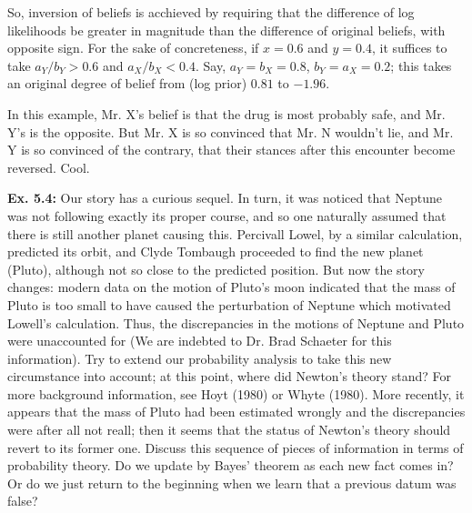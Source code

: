 \documentclass{article}
\begin{document}
So, inversion of beliefs is acchieved by requiring that the difference of log likelihoods be greater in magnitude than the difference of original beliefs, with opposite sign. For the sake of concreteness, if $x=0.6$ and $y=0.4$, it suffices to take $a_Y/b_Y>0.6$ and $a_X/b_X<0.4$. Say, $a_Y=b_X=0.8$, $b_Y=a_X=0.2$; this takes an original degree of belief from (log prior) $0.81$ to $-1.96$.

In this example, Mr. X's belief is that the drug is most probably safe, and Mr. Y's is the opposite. But Mr. X is so convinced that Mr. N wouldn't lie, and Mr. Y is so convinced of the contrary, that their stances after this encounter become reversed. Cool.

\textbf{Ex. 5.4: }Our story has a curious sequel. In turn, it was noticed that Neptune was not following exactly its proper course, and so one naturally assumed that there is still another planet causing this. Percivall Lowel, by a similar calculation, predicted its orbit, and Clyde Tombaugh proceeded to find the new planet (Pluto), although not so close to the predicted position. But now the story changes: modern data on the motion of Pluto's moon indicated that the mass of Pluto is too small to have caused the perturbation of Neptune which motivated Lowell's calculation. Thus, the discrepancies in the motions of Neptune and Pluto were unaccounted for (We are indebted to Dr. Brad Schaeter for this information). Try to extend our probability analysis to take this new circumstance into account; at this point, where did Newton's theory stand? For more background information, see Hoyt (1980) or Whyte (1980). More recently, it appears that the mass of Pluto had been estimated wrongly and the discrepancies were after all not reall; then it seems that the status of Newton's theory should revert to its former one. Discuss this sequence of pieces of information in terms of probability theory. Do we update by Bayes' theorem as each new fact comes in? Or do we just return to the beginning when we learn that a previous datum was false?
\end{document}
